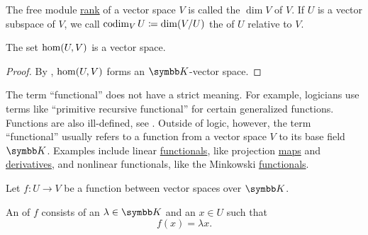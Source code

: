 \begin{definition}\label{def:vector_space_dimension}
  The free module \hyperref[def:free_left_module]{rank} of a vector space \( V \) is called the  \( \dim V \) of \( V \). If \( U \) is a vector subspace of \( V \), we call \( \operatorname{co}\!\dim_V U \coloneqq \dim(V/U) \) the  of \( U \) relative to \( V \).
\end{definition}

\begin{proposition}\label{thm:linear_maps_form_algebra}
  The set \( \operatorname{hom}(U, V) \) is a vector space.
\end{proposition}
\begin{proof}
  By , \( \operatorname{hom}(U, V) \) forms an \( \BK \)-vector space.
\end{proof}

\begin{remark}\label{remark:functional}
  The term \enquote{functional} does not have a strict meaning. For example, logicians use terms like \enquote{primitive recursive functional} for certain generalized functions. Functions are also ill-defined, see . Outside of logic, however, the term \enquote{functional} usually refers to a function from a vector space \( V \) to its base field \( \BK \). Examples include linear \hyperref[def:linear_operator]{functionals}, like projection \hyperref[def:left_module_basis_projection]{maps} and \hyperref[def:differentiability]{derivatives}, and nonlinear functionals, like the Minkowski \hyperref[def:minkowski_functional]{functionals}.
\end{remark}

\begin{definition}\label{def:eigenpair}
  Let \( f: U \to V \) be a function between vector spaces over \( \BK \).

  An  of \( f \) consists of an  \( \lambda \in \BK \) and an  \( x \in U \) such that
  \begin{equation*}
    f(x) = \lambda x.
  \end{equation*}
\end{definition}
